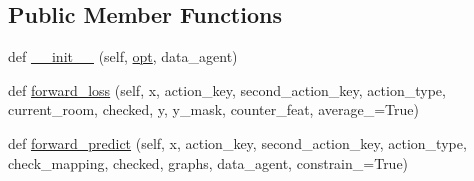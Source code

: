 \subsection*{Public Member Functions}
\begin{DoxyCompactItemize}
\item 
def \hyperlink{classmastering__the__dungeon_1_1agents_1_1graph__world2_1_1models_1_1ObjectChecklistModel_a3d91e40c45e7a98dacbe455fa4fc4855}{\+\_\+\+\_\+init\+\_\+\+\_\+} (self, \hyperlink{classmastering__the__dungeon_1_1agents_1_1graph__world2_1_1models_1_1ObjectChecklistModel_aaed641658fa203252d4b76862370bea0}{opt}, data\+\_\+agent)
\item 
def \hyperlink{classmastering__the__dungeon_1_1agents_1_1graph__world2_1_1models_1_1ObjectChecklistModel_a003f55fcaddd7a33512dea38e338d9d9}{forward\+\_\+loss} (self, x, action\+\_\+key, second\+\_\+action\+\_\+key, action\+\_\+type, current\+\_\+room, checked, y, y\+\_\+mask, counter\+\_\+feat, average\+\_\+=True)
\item 
def \hyperlink{classmastering__the__dungeon_1_1agents_1_1graph__world2_1_1models_1_1ObjectChecklistModel_aabcbed1be0d98035d2cfc4d3ad151256}{forward\+\_\+predict} (self, x, action\+\_\+key, second\+\_\+action\+\_\+key, action\+\_\+type, check\+\_\+mapping, checked, graphs, data\+\_\+agent, constrain\+\_\+=True)
\end{DoxyCompactItemize}
